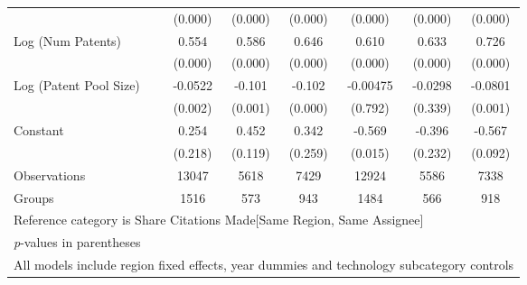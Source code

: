 \begin{table}[htbp]
\begin{adjustbox}{angle=90}
\begin{tabular}{l*{6}{c}}
                &  (0.000)&  (0.000)&  (0.000)&  (0.000)&  (0.000)&  (0.000)\\
Log (Num Patents)&    0.554&    0.586&    0.646&    0.610&    0.633&    0.726\\
                &  (0.000)&  (0.000)&  (0.000)&  (0.000)&  (0.000)&  (0.000)\\
Log (Patent Pool Size)&  -0.0522&   -0.101&   -0.102& -0.00475&  -0.0298&  -0.0801\\
                &  (0.002)&  (0.001)&  (0.000)&  (0.792)&  (0.339)&  (0.001)\\
Constant        &    0.254&    0.452&    0.342&   -0.569&   -0.396&   -0.567\\
                &  (0.218)&  (0.119)&  (0.259)&  (0.015)&  (0.232)&  (0.092)\\
\hline
Observations    &    13047&     5618&     7429&    12924&     5586&     7338\\
Groups          &     1516&      573&      943&     1484&      566&      918\\
\hline\hline
\multicolumn{7}{l}{\footnotesize Reference category is Share Citations Made[Same Region, Same Assignee]}\\
\multicolumn{7}{l}{\footnotesize \textit{p}-values in parentheses}\\
\multicolumn{7}{l}{\footnotesize All models include region fixed effects, year dummies and technology subcategory controls}\\
\end{tabular}
\end{adjustbox}
\end{table}
